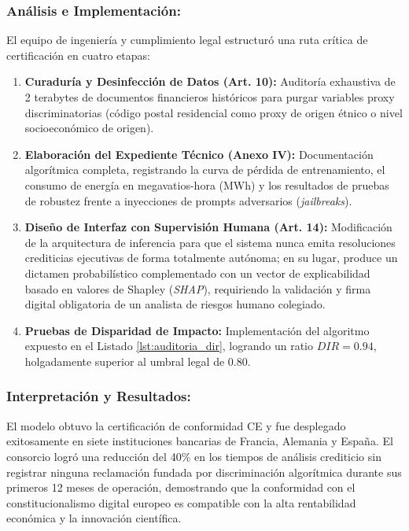 \subsubsection*{Análisis e Implementación:}
El equipo de ingeniería y cumplimiento legal estructuró una ruta crítica de certificación en cuatro etapas:
\begin{enumerate}[label=\alph*), leftmargin=2em]
    \item \textbf{Curaduría y Desinfección de Datos (Art. 10):} Auditoría exhaustiva de 2 terabytes de documentos financieros históricos para purgar variables proxy discriminatorias (código postal residencial como proxy de origen étnico o nivel socioeconómico de origen).
    \item \textbf{Elaboración del Expediente Técnico (Anexo IV):} Documentación algorítmica completa, registrando la curva de pérdida de entrenamiento, el consumo de energía en megavatios-hora (MWh) y los resultados de pruebas de robustez frente a inyecciones de prompts adversarios (\textit{jailbreaks}).
    \item \textbf{Diseño de Interfaz con Supervisión Humana (Art. 14):} Modificación de la arquitectura de inferencia para que el sistema nunca emita resoluciones crediticias ejecutivas de forma totalmente autónoma; en su lugar, produce un dictamen probabilístico complementado con un vector de explicabilidad basado en valores de Shapley (\textit{SHAP}), requiriendo la validación y firma digital obligatoria de un analista de riesgos humano colegiado.
    \item \textbf{Pruebas de Disparidad de Impacto:} Implementación del algoritmo expuesto en el Listado \ref{lst:auditoria_dir}, logrando un ratio $DIR = 0.94$, holgadamente superior al umbral legal de $0.80$.
\end{enumerate}

\subsubsection*{Interpretación y Resultados:}
El modelo obtuvo la certificación de conformidad CE y fue desplegado exitosamente en siete instituciones bancarias de Francia, Alemania y España. El consorcio logró una reducción del 40\% en los tiempos de análisis crediticio sin registrar ninguna reclamación fundada por discriminación algorítmica durante sus primeros 12 meses de operación, demostrando que la conformidad con el constitucionalismo digital europeo es compatible con la alta rentabilidad económica y la innovación científica.

